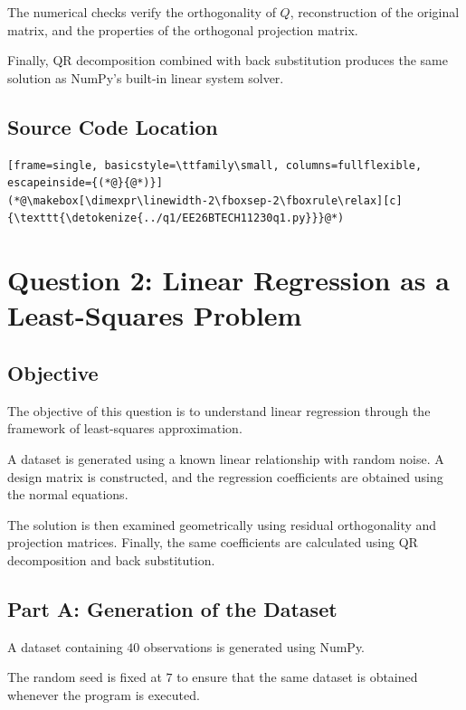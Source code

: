 \documentclass[12pt,a4paper]{article}
\numberwithin{equation}{section}
\begin{document}
The numerical checks verify the orthogonality
of $Q$, reconstruction of the original matrix,
and the properties of the orthogonal projection
matrix.

Finally, QR decomposition combined with back
substitution produces the same solution as
NumPy's built-in linear system solver.

\subsection{Source Code Location}

\begin{lstlisting}[frame=single, basicstyle=\ttfamily\small, columns=fullflexible, escapeinside={(*@}{@*)}]
(*@\makebox[\dimexpr\linewidth-2\fboxsep-2\fboxrule\relax][c]{\texttt{\detokenize{../q1/EE26BTECH11230q1.py}}}@*)
\end{lstlisting}


\section{Question 2: Linear Regression as a Least-Squares Problem}

\subsection{Objective}

The objective of this question is to understand
linear regression through the framework of
least-squares approximation.

A dataset is generated using a known linear
relationship with random noise. A design matrix
is constructed, and the regression coefficients
are obtained using the normal equations.

The solution is then examined geometrically using
residual orthogonality and projection matrices.
Finally, the same coefficients are calculated
using QR decomposition and back substitution.

\subsection{Part A: Generation of the Dataset}

A dataset containing $40$ observations is
generated using NumPy.

The random seed is fixed at $7$ to ensure
that the same dataset is obtained whenever
the program is executed.
\end{document}
